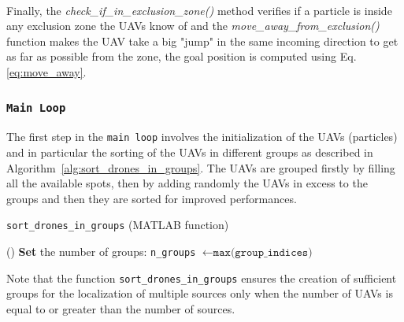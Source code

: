 \documentclass[main]{subfiles}
\begin{document}
\noindent\\
Finally, the
\textit{check\_if\_in\_exclusion\_zone()} 
method verifies if a particle is inside any 
exclusion zone the UAVs know of and  
the \textit{move\_away\_from\_exclusion()} function
makes the UAV take a big "jump" in the same incoming direction
to get as far as possible from the zone, the goal 
position is computed using Eq.\ref{eq:move_away}.

\subsubsection{\texttt{Main Loop}}
The first step in the \texttt{main loop} involves the initialization
of the UAVs (particles) and in particular the sorting of 
the UAVs in different groups as described in Algorithm~\ref{alg:sort_drones_in_groups}.
The UAVs are grouped firstly by filling 
all the available spots, then by adding randomly the UAVs in excess
to the groups and then they are sorted for improved performances.

\begin{algorithm}
    \caption{\texttt{sort\_drones\_in\_groups} (MATLAB function)}\label{alg:sort_drones_in_groups}
    \vspace{0.3\baselineskip}
    \nonl \Fn(\tcc*[h]{}){}{
    \SetAlgoBlockMarkers{}{}
    \textbf{Set} the number of groups: \texttt{n\_groups} $\gets \texttt{max(group\_indices)}$\;
 }
\end{algorithm}

\noindent Note that the function \texttt{sort\_drones\_in\_groups} ensures the creation of sufficient groups 
for the localization of multiple sources only when the number of UAVs is equal to or greater than 
the number of sources.
\end{document}
